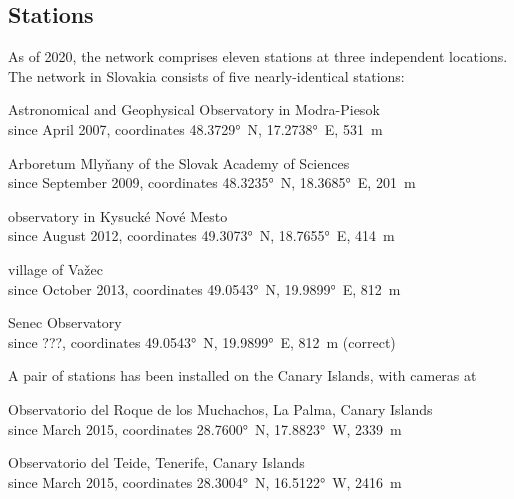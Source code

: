     \subsection{Stations} \label{iAs}
        As of 2020, the network comprises eleven stations at three independent locations.
        The network in Slovakia consists of five nearly-identical stations:
        \begin{description}[leftmargin = 25mm]
            \item[AGO]      Astronomical and Geophysical Observatory in Modra-Piesok\\
                            since April 2007, coordinates \ang{48.3729}~N, \ang{17.2738}~E, \SI{531}{\metre}
            \item[ARBO]     Arboretum Mlyňany of the Slovak Academy of Sciences\\
                            since September 2009, coordinates \ang{48.3235}~N, \ang{18.3685}~E, \SI{201}{\metre}
            \item[KNM]      observatory in Kysucké Nové Mesto\\
                            since August 2012, coordinates \ang{49.3073}~N, \ang{18.7655}~E, \SI{414}{\metre}
            \item[VAZEC]    village of Važec\\
                            since October 2013, coordinates \ang{49.0543}~N, \ang{19.9899}~E, \SI{812}{\metre}
            \item[SENEC]    Senec Observatory\\
                            since ???, coordinates \ang{49.0543}~N, \ang{19.9899}~E, \SI{812}{\metre} (correct)
        \end{description}

        A pair of stations has been installed on the Canary Islands, with cameras at
        \begin{description}[leftmargin = 25mm]
            \item[LP]       Observatorio del Roque de los Muchachos, La Palma, Canary Islands\\
                            since March 2015, coordinates \ang{28.7600}~N, \ang{17.8823}~W, \SI{2339}{\metre}
            \item[TE]       Observatorio del Teide, Tenerife, Canary Islands\\
                            since March 2015, coordinates \ang{28.3004}~N, \ang{16.5122}~W, \SI{2416}{\metre}
        \end{description}


